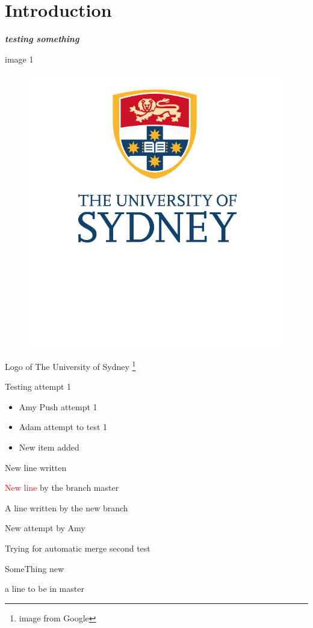 \documentclass[10pt]{article}
\newcommand{\boldit}[1]{\textbf{\textit{#1}}}
\begin{document}
\section{\textsf{Introduction}}
\boldit{testing something}

image 1 
\begin{figure}[hbt!]
  \centering
  \includegraphics{usyd}
\end{figure}

Logo of The University of Sydney \footnote{image from Google}

Testing attempt 1
\begin{itemize}
  \item Amy Push attempt 1
  \item Adam attempt to test 1
  \item New item added
\end{itemize}
New line written

\textcolor{red}{New line} by the branch master


A line written by the new branch

New attempt by Amy


Trying for automatic merge
second test

SomeThing new

a line to be in master
\end{document}
